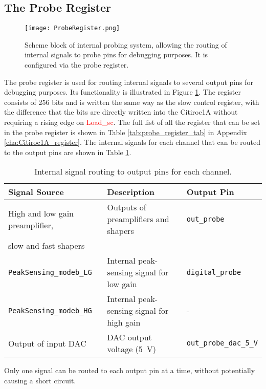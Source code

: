 \subsection{The Probe Register}\label{sec:probe_register}
\begin{figure}[H]
    \centering
    \texttt{[image: ProbeRegister.png]}
    \caption{Scheme block of internal probing system, allowing the routing of internal signals to probe pins for debugging purposes. It is configured via the probe register.\autocite{datasheetCITIROC}}
    \label{fig:CITIROC1A_proberegiseter}
\end{figure}
The probe register is used for routing internal signals to several output pins for debugging purposes.
Its functionality is illustrated in Figure \ref{fig:CITIROC1A_proberegiseter}.
The register consists of 256 bits and is written the same way as the slow control register,
 with the difference that the bits are directly written into the Citiroc1A without requiring a rising edge on \textcolor{red}{Load\_sc}.\autocite{datasheetCITIROC}
\newline
 The full list of all the register that can be set in the probe register is shown in Table \ref{tab:probe_register_tab} in Appendix \ref{cha:Citiroc1A_register}.
\newline
The internal signals for each channel that can be routed to the output pins are shown in Table \ref{tab:probe_register}. 
 \begin{table}[H]
    \centering
    \begin{tabular}{@{}lll@{}}
    \toprule
    \textbf{Signal Source} & \textbf{Description}                   & \textbf{Output Pin}        \\ \midrule
    High and low gain preamplifier, & Outputs of preamplifiers and shapers & \texttt{out\_probe}        \\
    slow and fast shapers                                                   &                          \\ \midrule
    \texttt{PeakSensing\_modeb\_LG} & Internal peak-sensing signal for low gain & \texttt{digital\_probe}    \\
    \texttt{PeakSensing\_modeb\_HG} & Internal peak-sensing signal for high gain & -    \\ \midrule
    Output of input DAC            & DAC output voltage (\SI{5}{\volt})  & \texttt{out\_probe\_dac\_5\_V} \\ \bottomrule
    \end{tabular}
    \caption{Internal signal routing to output pins for each channel.}
    \label{tab:probe_register}
\end{table}
Only one signal can be routed to each output pin at a time, without potentially causing a short circuit.\autocite{datasheetCITIROC}









 

